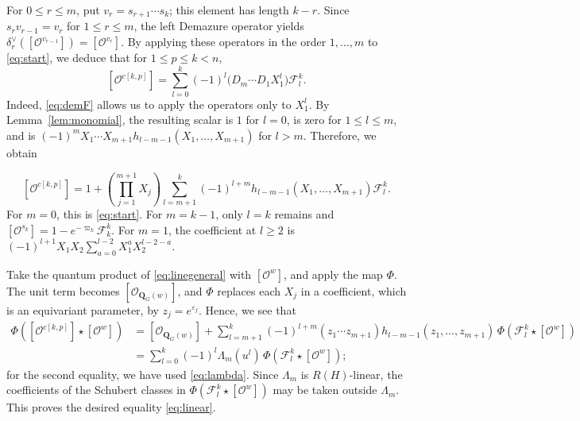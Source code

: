 \documentclass[11pt,a4paper,reqno]{amsart}
\DeclareRobustCommand{\rev}[1]{{\color{revision}#1}}
\newenvironment{revisiontext}{\par\begingroup\color{revision}}{\par\endgroup}
\numberwithin{equation}{section}
\theoremstyle{definition}
\newcommand{\QG}{\mathbf Q_G}
\newcommand{\OO}{\mathcal O}
\newcommand{\Sc}[1]{[\OO^{#1}]}
\newcommand{\Si}[1]{[\OO_{\QG(#1)}]}
\newcommand{\eps}{\varepsilon}
\newcommand{\FF}{\mathcal F}
\newcommand{\ck}{c[k,p]}
\begin{document}
\begin{revisiontext}
For \(0\le r\le m\), put \(v_r=s_{r+1}\cdots s_k\); this element has length \(k-r\). Since \(s_r v_{r-1}=v_r\) for \(1\le r\le m\), the left Demazure operator yields \(\delta_r^\vee(\Sc{v_{r-1}})=\Sc{v_r}\). By applying these operators in the order \(1,\ldots,m\) to \eqref{eq:start}, we deduce that for \(1 \le p \le k < n\), 
\[
 \Sc{\ck}=\sum_{l=0}^k(-1)^l
       \bigl(D_m\cdots D_1 X_1^l\bigr)\FF_l^k .
\]
\rev{Indeed, \eqref{eq:demF} allows us to apply the operators only to \(X_1^l\). By Lemma~\ref{lem:monomial}, the resulting scalar is \(1\) for \(l=0\), is zero for \(1\le l\le m\), and is \((-1)^mX_1\cdots X_{m+1}h_{l-m-1}(X_1,\ldots,X_{m+1})\) for \(l>m\). Therefore, we obtain}
\end{revisiontext}
\begin{equation}\label{eq:linegeneral}
 \Sc{c[k,p]}=1+
 \left(\prod_{j=1}^{m+1}X_j\right)
 \sum_{l=m+1}^k(-1)^{l+m}h_{l-m-1}(X_1,\ldots,X_{m+1})\FF_l^k .
\end{equation}
For \(m=0\), this is \eqref{eq:start}. For \(m=k-1\), only \(l=k\) remains and \(\Sc{s_k}=1-e^{-\varpi_k}\FF_k^k\). For \(m=1\), the coefficient at \(l\ge2\) is
\((-1)^{l+1}X_1X_2\sum_{a=0}^{l-2}X_1^a X_2^{l-2-a}\).
\begin{revisiontext}
Take the quantum product of \eqref{eq:linegeneral} with \(\Sc{w}\), and apply the map \(\Phi\). The unit term becomes \(\Si{w}\), and \(\Phi\) replaces each \(X_j\) in a coefficient, which is an equivariant parameter, by \(z_j=e^{\eps_j}\). Hence, we see that 
\[
\begin{aligned}
 \Phi(\Sc{\ck}\star\Sc{w})
 &=\Si{w}+\sum_{l=m+1}^k(-1)^{l+m}(z_1\cdots z_{m+1})
       h_{l-m-1}(z_1,\ldots,z_{m+1})\,\Phi(\FF_l^k\star\Sc{w})\\
 &=\sum_{l=0}^k(-1)^l\Lambda_m(u^l)\,\Phi(\FF_l^k\star\Sc{w}); 
\end{aligned}
\]
\rev{for the second equality, we have used \eqref{eq:lambda}. Since \(\Lambda_m\) is \(R(H)\)-linear, the coefficients of the Schubert classes in \(\Phi(\FF_l^k\star\Sc{w})\) may be taken outside \(\Lambda_m\). This proves the desired equality \eqref{eq:linear}.}
\end{revisiontext}
\end{document}
